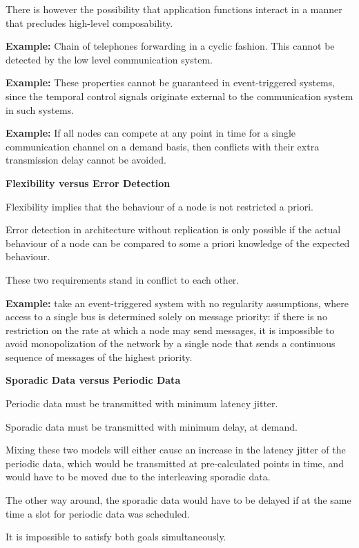 There is however the possibility that application functions interact in
a manner that precludes high-level composability.

\protect\hypertarget{oleux5flink2}{}{\protect\hypertarget{OLEux5fLINK2}{}{}}

\textbf{Example:} Chain of telephones forwarding in a cyclic fashion.
This cannot be detected by the low level communication system.

\textbf{Example:} These properties cannot be guaranteed in
event-triggered systems, since the temporal control signals originate
external to the communication system in such systems.

\textbf{Example:} If all nodes can compete at any point in time for a
single communication channel on a demand basis, then conflicts with
their extra transmission delay cannot be avoided.

\textbf{Flexibility versus Error Detection}

Flexibility implies that the behaviour of a node is not restricted a
priori.

Error detection in architecture without replication is only possible if
the actual behaviour of a node can be compared to some a priori
knowledge of the expected behaviour.

These two requirements stand in conflict to each other.

\textbf{Example:} take an event-triggered system with no regularity
assumptions, where access to a single bus is determined solely on
message priority: if there is no restriction on the rate at which a node
may send messages, it is impossible to avoid monopolization of the
network by a single node that sends a continuous sequence of messages of
the highest priority.

\textbf{Sporadic Data versus Periodic Data}

Periodic data must be transmitted with minimum latency jitter.

Sporadic data must be transmitted with minimum delay, at demand.

Mixing these two models will either cause an increase in the latency
jitter of the periodic data, which would be transmitted at
pre-calculated points in time, and would have to be moved due to the
interleaving sporadic data.

The other way around, the sporadic data would have to be delayed if at
the same time a slot for periodic data was scheduled.

It is impossible to satisfy both goals simultaneously.

